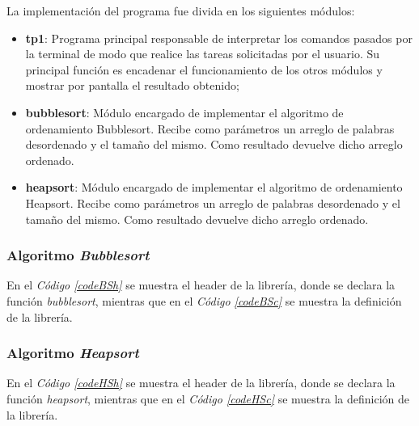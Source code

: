 \documentclass{article}
\newcommand{\refcode}[1]{\textit{Código \ref{#1}}}
\begin{document}
	La implementación del programa fue divida en los siguientes módulos:
	\medskip

\begin{itemize}

\itemsep=2pt \topsep=0pt \partopsep=0pt \parskip=0pt \parsep=0pt
	\item \textbf{tp1}: Programa principal responsable de interpretar los comandos pasados por la terminal de modo que realice las tareas solicitadas por el usuario. Su principal función es encadenar el funcionamiento de los otros módulos y mostrar por pantalla el resultado obtenido;
	\item \textbf{bubblesort}: Módulo encargado de implementar el algoritmo de ordenamiento Bubblesort. Recibe como parámetros un arreglo de palabras desordenado y el tamaño del mismo. Como resultado devuelve dicho arreglo ordenado.
	\item \textbf{heapsort}: Módulo encargado de implementar el algoritmo de ordenamiento Heapsort. Recibe como parámetros un arreglo de palabras desordenado y el tamaño del mismo. Como resultado devuelve dicho arreglo ordenado.

\end{itemize}	
\medskip


\subsubsection{Algoritmo \textit{Bubblesort}}

	En el \refcode{codeBSh} se muestra el header de la librería, donde se declara la función \textit{bubblesort}, mientras que en el \refcode{codeBSc} se muestra la definición de la librería.

\lstset{ language = C } %
 
\bigskip


\lstset{ language = C } %
 
\bigskip\bigskip




\subsubsection{Algoritmo \textit{Heapsort}}

	En el \refcode{codeHSh} se muestra el header de la librería, donde se declara la función \textit{heapsort}, mientras que en el \refcode{codeHSc} se muestra la definición de la librería.
\end{document}
